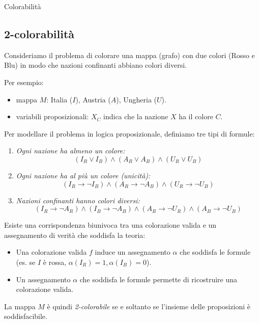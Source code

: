 \documentclass[a4paper,11pt]{report}
\begin{document}
\begin{gframe}{Colorabilità}
    \vspace{-1.5em}
\subsection*{2-colorabilità}

Consideriamo il problema di colorare una mappa (grafo) con due colori (Rosso e Blu) in modo che nazioni confinanti abbiano colori diversi.

Per esempio:
\begin{itemize}
    \item  mappa \( M \): Italia (\( I \)), Austria (\( A \)), Ungheria (\( U \)).
    \item variabili proposizionali: \( X_C \) indica che la nazione \( X \) ha il colore \( C \). 
\end{itemize}

Per modellare il problema in logica proposizionale, definiamo tre tipi di formule:

\begin{enumerate}
    \item \textit{Ogni nazione ha almeno un colore:}
    \[ (I_R \lor I_B) \land (A_R \lor A_B) \land (U_R \lor U_B) \]
    
    \item \textit{Ogni nazione ha al più un colore (unicità):}
    \[ (I_R \to \neg I_B) \land (A_R \to \neg A_B) \land (U_R \to \neg U_B) \]
    
    \item \textit{Nazioni confinanti hanno colori diversi:}
    \[ (I_R \to \neg A_R) \land (I_B \to \neg A_B) \land   (A_R \to \neg U_R) \land (A_B \to \neg U_B)  \]
\end{enumerate}

Esiste una corrispondenza biunivoca tra una colorazione valida e un assegnamento di verità che soddisfa la teoria:
\begin{itemize}
    \item Una colorazione valida \( f \) induce un assegnamento \( \alpha \) che soddisfa le formule (es. se \( I \) è rossa, \( \alpha(I_R)=1, \alpha(I_B)=0 \)).
    \item Un assegnamento \( \alpha \) che soddisfa le formule permette di ricostruire una colorazione valida.
\end{itemize}

La mappa \( M \) è quindi \textit{2-colorabile} se e soltanto se l'insieme delle proposizioni è soddisfacibile.


\end{gframe}
\end{document}

